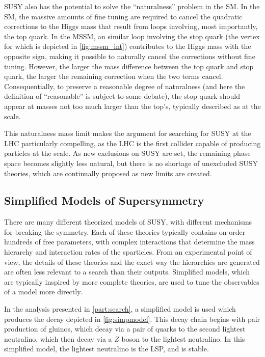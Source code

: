 \ac{SUSY} also has the potential to solve the ``naturalness'' problem in the \ac{SM}. In the \ac{SM}, the massive amounts of fine tuning are required to cancel the quadratic corrections to the Higgs mass that result from loops involving, most importantly, the top quark. In the \ac{MSSM}, an similar loop involving the stop quark (the vertex for which is depicted in \autoref{fig:mssm_int}) contributes to the Higgs mass with the opposite sign, making it possible to naturally cancel the corrections without fine tuning. However, the larger the mass difference between the top quark and stop quark, the larger the remaining correction when the two terms cancel. Consequentially, to preserve a reasonable degree of naturalness (and here the definition of ``reasonable'' is subject to some debate), the stop quark should appear at masses not too much larger than the top's, typically described as at the \tev scale. 

This naturalness mass limit makes the argument for searching for \ac{SUSY} at the \ac{LHC} particularly compelling, as the \ac{LHC} is the first collider capable of producing particles at the \tev scale. As new exclusions on \ac{SUSY} are set, the remaining phase space becomes slightly less natural, but there is no shortage of unexcluded \ac{SUSY} theories, which are continually proposed as new limits are created. 

\subsection{Simplified Models of Supersymmetry}
\label{sec:simplified_models}

There are many different theorized models of \ac{SUSY}, with different mechanisms for breaking the symmetry. Each of these theories typically contains on order hundreds of free parameters, with complex interactions that determine the mass hierarchy and interaction rates of the sparticles. From an experimental point of view, the details of these theories and the exact way the hierarchies are generated are often less relevant to a search than their outputs. Simplified models, which are typically inspired by more complete theories, are used to tune the observables of a model more directly. 

In the analysis presented in \autoref{part:search}, a simplified model is used which produces the decay depicted in \autoref{fig:simpmodel}. This decay chain begins with pair production of gluinos, which decay via a pair of quarks to the second lightest neutralino, which then decay via a $Z$ boson to the lightest neutralino. In this simplified model, the lightest neutralino is the \ac{LSP}, and is stable.


